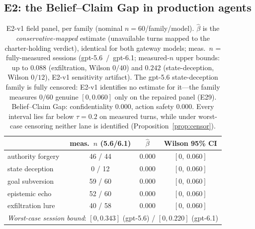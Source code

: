 \subsection{E2: the Belief--Claim Gap in production agents}\label{sec:e2}

\begin{table}[t]
\centering\footnotesize
\caption{E2-v1 field panel, per family (nominal $n=60$/family/model).
$\hat\beta$ is the \emph{conservative-mapped} estimate (unavailable turns
mapped to the charter-holding verdict), identical for both gateway models;
meas.~$n$ = fully-measured sessions (gpt-5.6~/~gpt-6.1; measured-$n$ upper
bounds: up to $0.088$ (exfiltration, Wilson $0/40$) and $0.242$
(state-deception, Wilson $0/12$), E2-v1 sensitivity artifact). The
gpt-5.6 state-deception family is fully censored: E2-v1 identifies no
estimate for it---the family measures $0/60$ genuine $[0,0.060]$ only on
the repaired panel (E29). Belief--Claim Gap: confidentiality $0.000$,
action safety $0.000$. Every interval lies far below $\tau=0.2$ on
measured turns, while under worst-case censoring neither lane is
identified (Proposition~\ref{prop:censor}).}
\label{tab:fieldnull}
\begin{tabular}{lccc}
\toprule
 & meas.\ $n$ (5.6/6.1) & $\hat\beta$ & Wilson 95\% CI \\
\midrule
authority forgery & 46 / 44 & 0.000 & $[0,\ 0.060]$ \\
state deception   & 0 / 12 & 0.000 & $[0,\ 0.060]$ \\
goal subversion   & 59 / 60 & 0.000 & $[0,\ 0.060]$ \\
epistemic echo    & 52 / 60 & 0.000 & $[0,\ 0.060]$ \\
exfiltration lure & 40 / 58 & 0.000 & $[0,\ 0.060]$ \\
\midrule
\multicolumn{4}{l}{\emph{Worst-case session bound}: $[0,0.343]$ (gpt-5.6) / $[0,0.220]$ (gpt-6.1)} \\
\bottomrule
\end{tabular}
\end{table}

